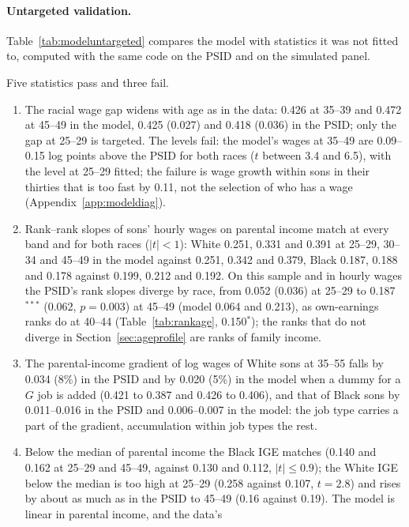 \paragraph{Untargeted validation.} Table~\ref{tab:modeluntargeted} compares the model with statistics it was not fitted
to, computed with the same code on the PSID and on the simulated panel.



\noindent Five statistics pass and three fail.
\begin{enumerate}[leftmargin=*, itemsep=0pt]
\item The racial wage gap widens with age as in the data: 0.426 at 35--39 and 0.472 at 45--49 in the model, 0.425
(0.027) and 0.418 (0.036) in the PSID; only the gap at 25--29 is targeted. The levels fail: the model's wages at 35--49
are 0.09--0.15 log points above the PSID for both races ($t$ between 3.4 and 6.5), with the level at 25--29 fitted;
the failure is wage growth within sons in their thirties that is too fast by 0.11, not the selection of who
has a wage (Appendix~\ref{app:modeldiag}).
\item Rank--rank slopes of sons' hourly wages on parental income match at every band and for both races ($|t| < 1$):
White 0.251, 0.331 and 0.391 at 25--29, 30--34 and 45--49 in the model against 0.251, 0.342 and 0.379, Black 0.187,
0.188 and 0.178 against 0.199, 0.212 and 0.192. On this sample and in hourly wages the PSID's rank slopes diverge by race, from
0.052 (0.036) at 25--29 to 0.187$^{***}$ (0.062, $p = 0.003$) at 45--49 (model 0.064 and 0.213), as own-earnings ranks do
at 40--44 (Table~\ref{tab:rankage}, 0.150$^{*}$); the ranks that do not
diverge in Section~\ref{sec:ageprofile} are ranks of family income.
\item The parental-income gradient of log wages of White sons at 35--55 falls by 0.034 (8\%) in the PSID and by
0.020 (5\%) in the model when a dummy for a $G$ job is added (0.421 to 0.387 and 0.426 to 0.406), and that of Black sons
by 0.011--0.016 in the PSID and 0.006--0.007 in the model: the job type carries a part of the gradient, accumulation
within job types the rest.
\item Below the median of parental income the Black IGE matches (0.140 and 0.162 at 25--29 and 45--49, against 0.130 and
0.112, $|t| \le 0.9$); the White IGE below the median is too high at 25--29 (0.258 against 0.107, $t = 2.8$) and rises
by about as much as in the PSID to 45--49 (0.16 against 0.19). The model is linear in parental income, and the data's

\end{enumerate}
